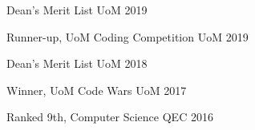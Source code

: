 

\cvsubsection{}


\begin{cvhonors}

  \cvhonor
    {} %
    {Dean's Merit List} %
    {UoM} %
    {2019} %

  \cvhonor
    {Runner-up,} %
    {UoM Coding Competition} %
    {UoM} %
    {2019} %

  \cvhonor
    {} %
    {Dean's Merit List} %
    {UoM} %
    {2018} %

  \cvhonor
    {Winner,} %
    {UoM Code Wars} %
    {UoM} %
    {2017} %

    \cvhonor
        {Ranked 9th,} %
        {Computer Science} %
        {QEC} %
        {2016} %

\end{cvhonors}
